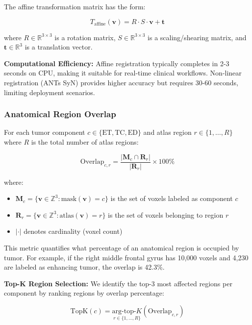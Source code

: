 \documentclass[conference]{IEEEtran}
\begin{document}
The affine transformation matrix has the form:

\begin{equation}
T_{\text{affine}}(\mathbf{v}) = R \cdot S \cdot \mathbf{v} + \mathbf{t}
\end{equation}

where $R \in \mathbb{R}^{3 \times 3}$ is a rotation matrix, $S \in \mathbb{R}^{3 \times 3}$ is a scaling/shearing matrix, and $\mathbf{t} \in \mathbb{R}^3$ is a translation vector.

\textbf{Computational Efficiency:} Affine registration typically completes in 2-3 seconds on CPU, making it suitable for real-time clinical workflows. Non-linear registration (ANTs SyN) provides higher accuracy but requires 30-60 seconds, limiting deployment scenarios.

\subsubsection{Anatomical Region Overlap}

For each tumor component $c \in \{\text{ET}, \text{TC}, \text{ED}\}$ and atlas region $r \in \{1, \ldots, R\}$ where $R$ is the total number of atlas regions:

\begin{equation}
\text{Overlap}_{c,r} = \frac{|\mathbf{M}_c \cap \mathbf{R}_r|}{|\mathbf{R}_r|} \times 100\%
\end{equation}

where:
\begin{itemize}
\item $\mathbf{M}_c = \{\mathbf{v} \in \mathbb{Z}^3 : \text{mask}(\mathbf{v}) = c\}$ is the set of voxels labeled as component $c$
\item $\mathbf{R}_r = \{\mathbf{v} \in \mathbb{Z}^3 : \text{atlas}(\mathbf{v}) = r\}$ is the set of voxels belonging to region $r$
\item $|\cdot|$ denotes cardinality (voxel count)
\end{itemize}

This metric quantifies what percentage of an anatomical region is occupied by tumor. For example, if the right middle frontal gyrus has 10,000 voxels and 4,230 are labeled as enhancing tumor, the overlap is 42.3\%.

\textbf{Top-K Region Selection:} We identify the top-3 most affected regions per component by ranking regions by overlap percentage:

\begin{equation}
\text{TopK}(c) = \underset{r \in \{1,\ldots,R\}}{\text{arg-top-}K} \left(\text{Overlap}_{c,r}\right)
\end{equation}
\end{document}
